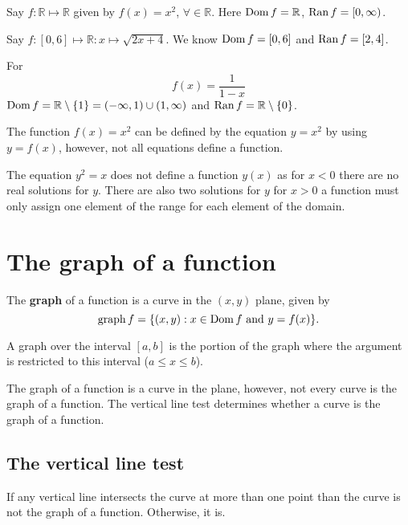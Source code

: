 \begin{example}
    Say $f:\mathbb R\mapsto\mathbb R$ given by $f(x)=x^2$, $\forall \in\mathbb R$. Here $\operatorname{Dom}{f}=\mathbb R$, $\operatorname{Ran}{f}=[0,\infty)$.
\end{example}

\begin{example}
    Say $f:[0,6]\mapsto\mathbb R:x\mapsto\sqrt{2x+4}$. We know $\operatorname{Dom}{f}=[0,6]$ and $\operatorname{Ran}{f}=[2,4]$.
\end{example}

\begin{example}
    For
    \[f(x)=\dfrac{1}{1-x}\]
    $\operatorname{Dom}{f} = \mathbb R\setminus\{1\}=(-\infty, 1)\cup(1,\infty)$ and $\operatorname{Ran}{f}=\mathbb R\setminus\{0\}$.
\end{example}

The function $f(x)=x^2$ can be defined by the equation $y=x^2$ by using $y=f(x)$, however, not all equations define a function.

\begin{example}
    The equation $y^2=x$ does not define a function $y(x)$ as for $x<0$ there are no real solutions for $y$. There are also two solutions for $y$ for $x>0$ a function must only assign one element of the range for each element of the domain.
\end{example}

\section{The graph of a function}

\begin{definition}
    The \textbf{graph} of a function is a curve in the $(x,y)$ plane, given by
    \[\text{graph\,}f=\{(x,y):x\in\operatorname{Dom} f \text{ and } y=f(x)\}.\]
\end{definition}

A graph over the interval $[a,b]$ is the portion of the graph where the argument is restricted to this interval ($a\leq x\leq b$).

The graph of a function is a curve in the plane, however, not every curve is the graph of a function. The vertical line test determines whether a curve is the graph of a function.

\subsection{The vertical line test}

If any vertical line intersects the curve at more than one point than the curve is not the graph of a function. Otherwise, it is.

